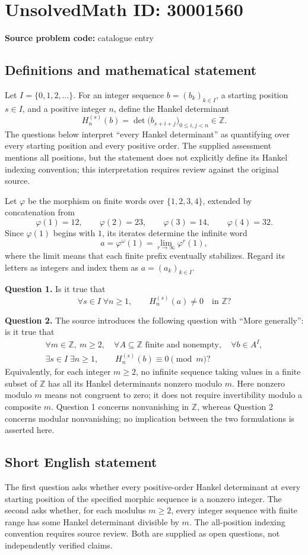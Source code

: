 \documentclass[11pt]{article}
\newcommand{\Z}{\mathbb{Z}}
\begin{document}
\section*{UnsolvedMath ID: 30001560}
\textbf{Source problem code:} catalogue entry
\subsection{Definitions and mathematical statement}
Let \(I=\{0,1,2,\ldots\}\). For an integer sequence \(b=(b_k)_{k\in I}\), a starting position \(s\in I\), and a positive integer \(n\), define the Hankel determinant
\[
H_n^{(s)}(b)=\det\bigl(b_{s+i+j}\bigr)_{0\leq i,j<n}\in\Z.
\]
The questions below interpret ``every Hankel determinant'' as quantifying over every starting position and every positive order. The supplied assessment mentions all positions, but the statement does not explicitly define its Hankel indexing convention; this interpretation requires review against the original source.

Let \(\varphi\) be the morphism on finite words over \(\{1,2,3,4\}\), extended by concatenation from
\[
\varphi(1)=12,\qquad \varphi(2)=23,\qquad
\varphi(3)=14,\qquad \varphi(4)=32.
\]
Since \(\varphi(1)\) begins with \(1\), its iterates determine the infinite word
\[
a=\varphi^\omega(1)=\lim_{r\to\infty}\varphi^r(1),
\]
where the limit means that each finite prefix eventually stabilizes. Regard its letters as integers and index them as \(a=(a_k)_{k\in I}\).

\textbf{Question 1.} Is it true that
\[
\forall s\in I\;\forall n\geq1,\qquad H_n^{(s)}(a)\neq0
\quad\text{in }\Z?
\]

\textbf{Question 2.} The source introduces the following question with ``More generally'': is it true that
\[
\begin{gathered}
\forall m\in\Z,\ m\geq2,\quad
\forall A\subseteq\Z\text{ finite and nonempty},\quad
\forall b\in A^I,\\
\exists s\in I\;\exists n\geq1,\qquad
H_n^{(s)}(b)\equiv0\pmod m?
\end{gathered}
\]
Equivalently, for each integer \(m\geq2\), no infinite sequence taking values in a finite subset of \(\Z\) has all its Hankel determinants nonzero modulo \(m\). Here nonzero modulo \(m\) means not congruent to zero; it does not require invertibility modulo a composite \(m\). Question 1 concerns nonvanishing in \(\Z\), whereas Question 2 concerns modular nonvanishing; no implication between the two formulations is asserted here.
\subsection{Short English statement}
The first question asks whether every positive-order Hankel determinant at every starting position of the specified morphic sequence is a nonzero integer. The second asks whether, for each modulus \(m\geq2\), every integer sequence with finite range has some Hankel determinant divisible by \(m\). The all-position indexing convention requires source review. Both are supplied as open questions, not independently verified claims.
\end{document}

